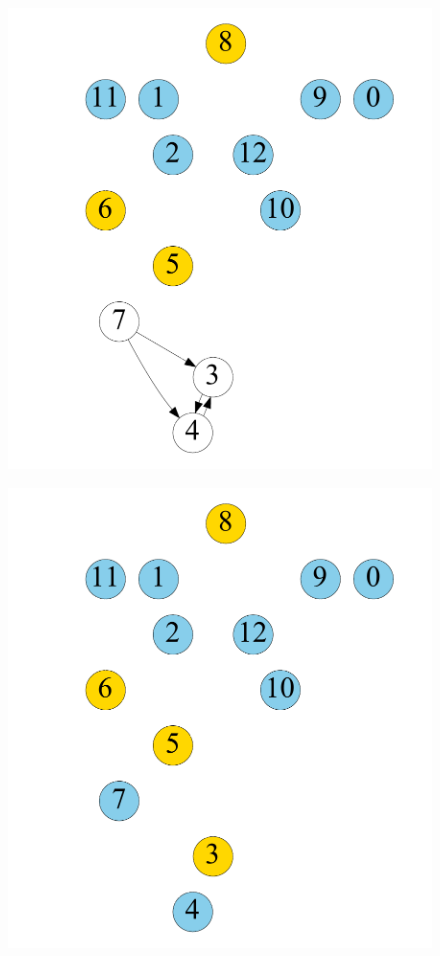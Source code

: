 \begin{figure}[t]
\begin{minipage}[b]{0.19\linewidth}
			{\includegraphics[width=\textwidth]{./alg_fig/simple-g6}}
   		\end{minipage}                  
    \begin{minipage}[b]{0.19\linewidth}
            \centering
            {\includegraphics[width=\textwidth]{./alg_fig/simple-g8}}

\end{minipage}
\end{figure}
